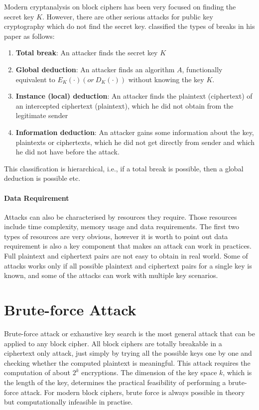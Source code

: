Modern cryptanalysis on block ciphers has been very focused on finding the secret key $K$. However, there are other serious attacks for public key cryptography which do not find the secret key. \cite{knudsen1994block} classified the types of breaks in his paper as follows:
\begin{enumerate}
	\item \textbf{Total break}: An attacker finds the secret key $K$
	\item \textbf{Global deduction}: An attacker finds an algorithm $A$, functionally equivalent to $E_{K}(\cdot)(or\ D_{K}(\cdot))$ without knowing the key $K$.
	\item \textbf{Instance (local) deduction}: An attacker finds the plaintext (ciphertext) of an intercepted ciphertext (plaintext), which he did not obtain from the legitimate sender
	\item \textbf{Information deduction}: An attacker gains some information about the key, plaintexts or ciphertexts, which he did not get directly from sender and which he did not have before the attack.
\end{enumerate} 
This classification is hierarchical, i.e., if a total break is possible, then a global deduction is possible etc.

\paragraph{Data Requirement} Attacks can also be characterised by resources they require. Those resources include time complexity, memory usage and data requirements. The first two types of resources are very obvious, however it is worth to point out data requirement is also a key component that makes an attack can work in practices. Full plaintext and ciphertext pairs are not easy to obtain in real world. Some of attacks works only if all possible plaintext and ciphertext pairs for a single key is known, and some of the attacks can work with multiple key scenarios. 
\section{Brute-force Attack}
Brute-force attack or exhaustive key search is the most general attack that can be applied to any block cipher. All block ciphers are totally breakable in a ciphertext only attack, just simply by trying all the possible keys one by one and checking whether the computed plaintext is meaningful. This attack requires the computation of about $2^{k}$ encryptions. The dimension of the key space $k$, which is the length of the key, determines the practical feasibility of performing a brute-force attack. For modern block ciphers, brute force is always possible in theory but computationally infeasible in practise.
